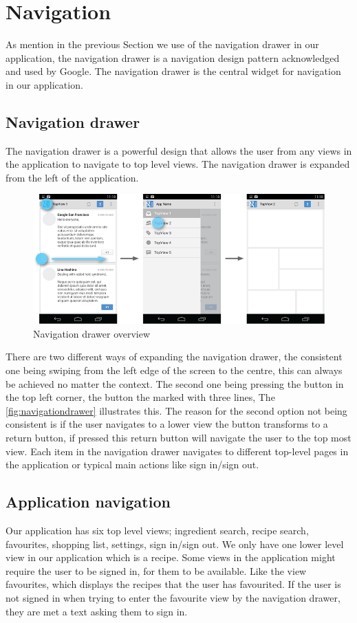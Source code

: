 \section{Navigation}\label{sec:navigation}
As mention in the previous Section we use of the navigation drawer in our application, the navigation drawer is a navigation design pattern acknowledged and used by Google.\cite{guidelines-navigationdrawer} The navigation drawer is the central widget for navigation in our application.
 
\subsection{Navigation drawer}
The navigation drawer is a powerful design that allows the user from any views in the application to navigate to top level views. The navigation drawer is expanded from the left of the application.
\begin{figure}[H]
\centering
\includegraphics[width=0.9\linewidth]{img/screenshots/navigation_drawer_overview.png}
\caption{Navigation drawer overview \cite{guidelines-navigationdrawer}}
\label{fig:navigationdrawer}
\end{figure}
There are two different ways of expanding the navigation drawer, the consistent one being swiping from the left edge of the screen to the centre, this can always be achieved no matter the context. 
The second one being pressing the button in the top left corner, the button the marked with three lines, The \autoref{fig:navigationdrawer} illustrates this. 
The reason for the second option not being consistent is if the user navigates to a lower view the button transforms to a return button, if pressed this return button will navigate the user to the top most view. 
Each item in the navigation drawer navigates to different top-level pages in the application or typical main actions like sign in/sign out.

\subsection{Application navigation}
Our application has six top level views; ingredient search, recipe search, favourites, shopping list, settings, sign in/sign out. 
We only have one lower level view in our application which is a recipe. Some views in the application might require the user to be signed in, for them to be available. Like the view favourites, which displays the recipes that the user has favourited. If the user is not signed in when trying to enter the favourite view by the navigation drawer, they are met a text asking them to sign in.

